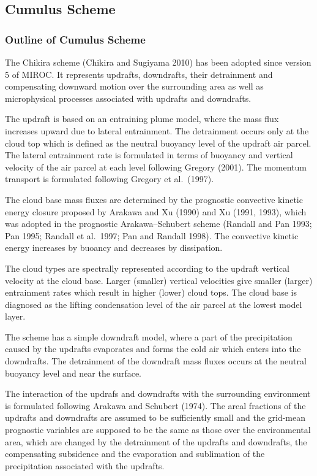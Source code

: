 \hypertarget{cumulus-scheme}{%
\subsection{Cumulus Scheme}\label{cumulus-scheme}}

\hypertarget{outline-of-cumulus-scheme}{%
\subsubsection{Outline of Cumulus Scheme}\label{outline-of-cumulus-scheme}}

The Chikira scheme (Chikira and Sugiyama 2010) has been adopted since version 5 of MIROC. It represents updrafts, downdrafts, their detrainment and compensating downward motion over the surrounding
area as well as microphysical processes associated with updrafts and downdrafts.

The updraft is based on an entraining plume model, where the mass flux increases upward due to lateral entrainment. The detrainment occurs only at the cloud top which is defined as the neutral
buoyancy level of the updraft air parcel. The lateral entrainment rate is formulated in terms of buoyancy and vertical velocity of the air parcel at each level following Gregory (2001). The momentum
transport is formulated following Gregory et al.~(1997).

The cloud base mass fluxes are determined by the prognostic convective kinetic energy closure proposed by Arakawa and Xu (1990) and Xu (1991, 1993), which was adopted in the prognostic
Arakawa--Schubert scheme (Randall and Pan 1993; Pan 1995; Randall et al.~1997; Pan and Randall 1998). The convective kinetic energy increases by buoancy and decreases by dissipation.

The cloud types are spectrally represented according to the updraft vertical velocity at the cloud base. Larger (smaller) vertical velocities give smaller (larger) entrainment rates which result in
higher (lower) cloud tops. The cloud base is diagnosed as the lifting condensation level of the air parcel at the lowest model layer.

The scheme has a simple downdraft model, where a part of the precipitation caused by the updrafts evaporates and forms the cold air which enters into the downdrafts. The detrainment of the downdraft
mass fluxes occurs at the neutral buoyancy level and near the surface.

The interaction of the updrafs and downdrafts with the surrounding environment is formulated following Arakawa and Schubert (1974). The areal fractions of the updrafts and downdrafts are assumed to be
sufficiently small and the grid-mean prognostic variables are supposed to be the same as those over the environmental area, which are changed by the detrainment of the updrafts and downdrafts, the
compensating subsidence and the evaporation and sublimation of the precipitation associated with the updrafts.

